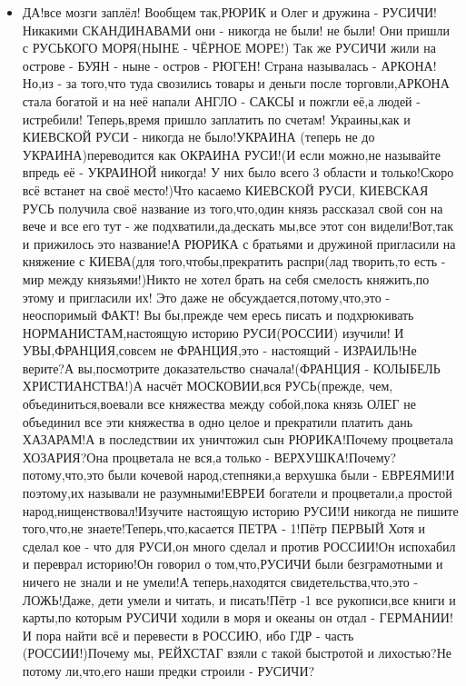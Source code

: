\begin{itemize}
\item {}

ДА!все мозги заплёл! Вообщем так,РЮРИК и Олег и дружина -
РУСИЧИ!Никакими СКАНДИНАВАМИ они - никогда не были! не были! Они пришли
с РУСЬКОГО МОРЯ(НЫНЕ - ЧЁРНОЕ МОРЕ!) Так же РУСИЧИ жили на острове -
БУЯН - ныне - остров - РЮГЕН! Страна называлась - АРКОНА! Но,из - за
того,что туда свозились товары и деньги после торговли,АРКОНА стала
богатой и на неё напали АНГЛО - САКСЫ и пожгли её,а людей - истребили!
Теперь,время пришло заплатить по счетам! Украины,как и КИЕВСКОЙ РУСИ -
никогда не было!УКРАИНА (теперь не до УКРАИНА)переводится как ОКРАИНА
РУСИ!(И если можно,не называйте впредь её - УКРАИНОЙ никогда! У них
было всего 3 области и только!Скоро всё встанет на своё место!)Что
касаемо КИЕВСКОЙ РУСИ, КИЕВСКАЯ РУСЬ получила своё название из
того,что,один князь рассказал свой сон на вече и все его тут - же
подхватили,да,дескать мы,все этот сон видели!Вот,так и прижилось это
название!А РЮРИКА с братьями и дружиной пригласили на княжение с
КИЕВА(для того,чтобы,прекратить распри(лад творить,то есть - мир между
князьями!)Никто не хотел брать на себя смелость княжить,по этому и
пригласили их! Это даже не обсуждается,потому,что,это - неоспоримый
ФАКТ! Вы бы,прежде чем ересь писать и подхрюкивать
НОРМАНИСТАМ,настоящую историю РУСИ(РОССИИ) изучили! И
УВЫ,ФРАНЦИЯ,совсем не ФРАНЦИЯ,это - настоящий - ИЗРАИЛЬ!Не верите?А
вы,посмотрите доказательство сначала!(ФРАНЦИЯ - КОЛЫБЕЛЬ
ХРИСТИАНСТВА!)А насчёт МОСКОВИИ,вся РУСЬ(прежде, чем,
объединиться,воевали все княжества между собой,пока князь ОЛЕГ не
объединил все эти княжества в одно целое и прекратили платить дань
ХАЗАРАМ!А в последствии их уничтожил сын РЮРИКА!Почему процветала
ХОЗАРИЯ?Она процветала не вся,а только - ВЕРХУШКА!Почему?потому,что,это
были кочевой народ,степняки,а верхушка были - ЕВРЕЯМИ!И поэтому,их
называли не разумными!ЕВРЕИ богатели и процветали,а простой
народ,нищенствовал!Изучите настоящую историю РУСИ!И никогда не пишите
того,что,не знаете!Теперь,что,касается ПЕТРА - 1!Пётр ПЕРВЫЙ Хотя и
сделал кое - что для РУСИ,он много сделал и против РОССИИ!Он испохабил
и переврал историю!Он говорил о том,что,РУСИЧИ были безграмотными и
ничего не знали и не умели!А теперь,находятся свидетельства,что,это -
ЛОЖЬ!Даже, дети умели и читать, и писать!Пётр -1 все рукописи,все книги
и карты,по которым РУСИЧИ ходили в моря и океаны он отдал - ГЕРМАНИИ!И
пора найти всё и перевести в РОССИЮ, ибо ГДР - часть (РОССИИ!)Почему
мы, РЕЙХСТАГ взяли с такой быстротой и лихостью?Не потому ли,что,его
наши предки строили - РУСИЧИ?


\end{itemize}
